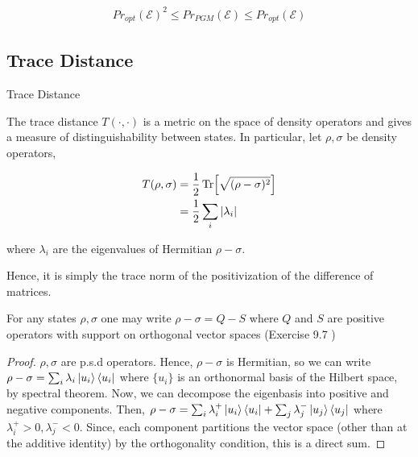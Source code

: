 \documentclass[main.tex]{subfiles}
\begin{document}
{\begin{subappendices}
\begin{theorem}
\begin{align*}
Pr_{opt}(\mathcal{E})^2 \leq Pr_{PGM}(\mathcal{E}) \leq 	Pr_{opt}(\mathcal{E})
\end{align*}

\end{theorem}

\subsection{Trace Distance}

\begin{definition}
Trace Distance

The trace distance $T(\cdot , \cdot)$ is a metric on the space of density operators and gives a measure of distinguishability between states. In particular, let $\rho, \sigma$ be density operators,

\begin{align*}
	T(\rho, \sigma) &= \frac{1}{2} \Tr [\sqrt{(\rho - \sigma)^2}] \\
	&= \frac{1}{2} \sum_i |\lambda_i|
\end{align*}

where $\lambda_i$ are the eigenvalues of Hermitian $\rho - \sigma$.

Hence, it is simply the trace norm of the positivization of the difference of matrices.

\end{definition}

\begin{lemma}
For any states $\rho, \sigma$ one may write $\rho - \sigma = Q - S$ where $Q$ and $S$ are positive operators with support on orthogonal vector spaces	(Exercise 9.7 \cite{nielsen2010quantum})
\end{lemma}

\begin{proof}
$\rho, \sigma$ are p.s.d operators. Hence, $\rho - \sigma$ is Hermitian, so we can write $\rho - \sigma = \sum_i \lambda_i \ket{u_i}\bra{u_i}$ where $\{ u_i \}$ is an orthonormal basis of the Hilbert space, by spectral theorem. Now, we can decompose the eigenbasis into positive and negative components. Then, $\rho - \sigma = \sum_i \lambda^+_i \ket{u_i}\bra{u_i} + \sum_j \lambda^-_j\ket{u_j}\bra{u_j}$ where $\lambda^+_i >0, \lambda^-_j < 0$. Since, each component partitions the vector space (other than at the additive identity) by the orthogonality condition, this is a direct sum.
\end{proof}



\end{subappendices}}
\end{document}
